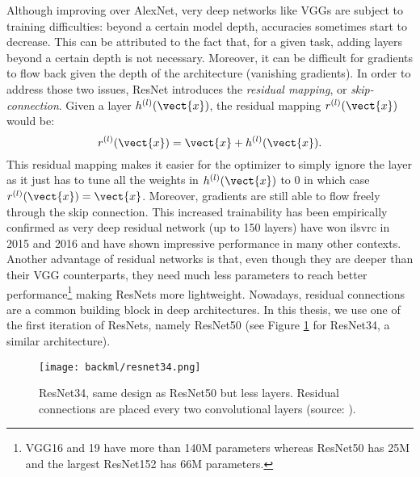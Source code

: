 Although improving over AlexNet, very deep networks like VGGs are subject to
training difficulties: beyond a certain model depth, accuracies sometimes start
to decrease. This can be attributed to the fact that, for a given task, adding
layers beyond a certain depth is not necessary. Moreover, it can be difficult for
gradients to flow back given the depth of the architecture (\ie vanishing gradients).
In order to address those two issues, ResNet \cite{he2016deep} introduces
the \textit{residual mapping}, or \textit{skip-connection}. Given a layer
$h^{(l)}(\vect{x})$, the residual mapping $r^{(l)}(\vect{x})$ would be:
\begin{equation}
\label{eqn:backml:residual}
r^{(l)}(\vect{x}) = \vect{x} + h^{(l)}(\vect{x}).
\end{equation}
This residual mapping makes it easier for the optimizer to simply ignore the layer
as it just has to tune all the weights in $h^{(l)}(\vect{x})$ to 0 in which case
$r^{(l)}(\vect{x}) = \vect{x}$. Moreover, gradients are still able to flow freely
through the skip connection. This increased trainability has been empirically
confirmed as very deep residual network (up to 150 layers) have won \acrshort{ilsvrc}
in 2015 and 2016 and have shown impressive performance in many other contexts.
Another advantage of residual networks is that, even though they are deeper than
their VGG counterparts, they need much less parameters to reach better
performance\footnote{VGG16 and 19 have more than 140M parameters whereas ResNet50 has 25M and the largest ResNet152 has 66M parameters.}
making ResNets more lightweight. Nowadays, residual connections are a common
building block in deep architectures. In this thesis, we use one of the first
iteration of ResNets, namely ResNet50 (see Figure \ref{fig:backml:resnet} for
ResNet34, a similar architecture).

\begin{figure}
  \centering
  \texttt{[image: backml/resnet34.png]}
  \caption{ResNet34, same design as ResNet50 but less layers. Residual connections are placed every two convolutional layers (source: \cite{he2016deep}).}
  \label{fig:backml:resnet}
\end{figure}

